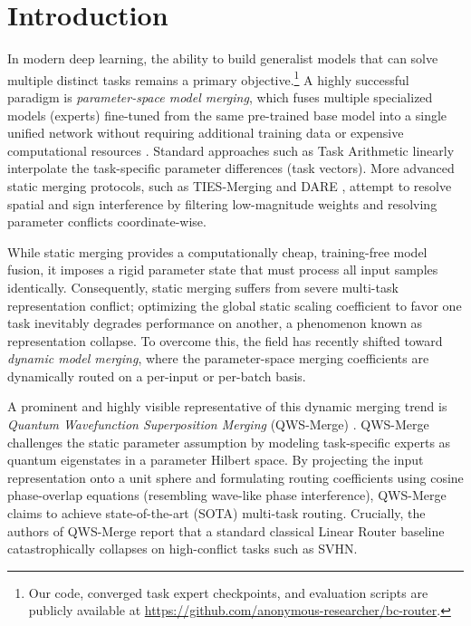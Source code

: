 \section{Introduction}
\label{sec:intro}

In modern deep learning, the ability to build generalist models that can solve multiple distinct tasks remains a primary objective.\footnote{Our code, converged task expert checkpoints, and evaluation scripts are publicly available at \href{https://github.com/anonymous-researcher/bc-router}{https://github.com/anonymous-researcher/bc-router}.} A highly successful paradigm is \emph{parameter-space model merging}, which fuses multiple specialized models (experts) fine-tuned from the same pre-trained base model into a single unified network without requiring additional training data or expensive computational resources \cite{task_arithmetic, ties_merging}. Standard approaches such as Task Arithmetic \cite{task_arithmetic} linearly interpolate the task-specific parameter differences (task vectors). More advanced static merging protocols, such as TIES-Merging \cite{ties_merging} and DARE \cite{dare}, attempt to resolve spatial and sign interference by filtering low-magnitude weights and resolving parameter conflicts coordinate-wise.

While static merging provides a computationally cheap, training-free model fusion, it imposes a rigid parameter state that must process all input samples identically. Consequently, static merging suffers from severe multi-task representation conflict; optimizing the global static scaling coefficient to favor one task inevitably degrades performance on another, a phenomenon known as representation collapse. To overcome this, the field has recently shifted toward \emph{dynamic model merging}, where the parameter-space merging coefficients are dynamically routed on a per-input or per-batch basis.

A prominent and highly visible representative of this dynamic merging trend is \emph{Quantum Wavefunction Superposition Merging} (QWS-Merge) \cite{qws_merge}. QWS-Merge challenges the static parameter assumption by modeling task-specific experts as quantum eigenstates in a parameter Hilbert space. By projecting the input representation onto a unit sphere and formulating routing coefficients using cosine phase-overlap equations (resembling wave-like phase interference), QWS-Merge claims to achieve state-of-the-art (SOTA) multi-task routing. Crucially, the authors of QWS-Merge report that a standard classical Linear Router baseline catastrophically collapses on high-conflict tasks such as SVHN.

